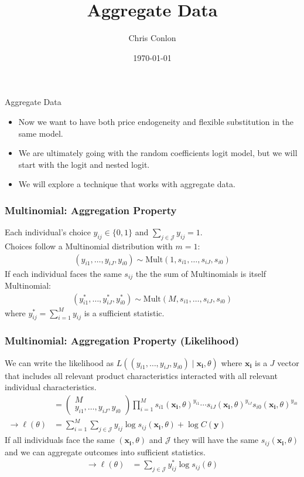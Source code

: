 \documentclass[xcolor=pdftex,dvipsnames,table,mathserif,aspectratio=169]{beamer}
\begin{document}
\title{Aggregate Data}
\author{Chris Conlon}
\date{\today}

\frame{\titlepage}

\begin{frame}{Aggregate Data}
 \begin{itemize}
\item Now we want to have both \alert{price endogeneity} and \alert{flexible substitution} in the same model.
\item We are ultimately going with the random coefficients logit model, but we will start with the logit and nested logit.
\item We will explore a technique that works with \alert{aggregate data}.
 \end{itemize}
\end{frame}



\begin{frame}
\frametitle{Multinomial:  Aggregation Property}
Each individual's choice $y_{ij} \in\{0,1\}$ and $\sum_{j \in \mathcal{J}} y_{ij} =1$.\\

Choices follow a Multinomial distribution with $m=1$:
\begin{align*}
(y_{i1},\ldots,y_{iJ},y_{i0}) \sim \text{Mult} (1,s_{i1},\ldots,s_{iJ},s_{i0} ) 
\end{align*}
If each individual faces the same $s_{ij}$ the the sum of Multinomials is itself Multinomial:
\begin{align*}
(y_{i1}^{*},\ldots,y_{iJ}^{*},y_{i0}^{*}) \sim \text{Mult} (M, s_{i1},\ldots,s_{iJ},s_{i0} ) 
\end{align*}
where $y_{ij}^{*}=\sum_{i=1}^M y_{ij}$ is a \alert{sufficient statistic}.
\end{frame}

\begin{frame}
\frametitle{Multinomial:  Aggregation Property (Likelihood)}
We can write the likelihood as $L\left((y_{i1},\ldots,y_{iJ},y_{i0})  \mid \mathbf{x_i},  \theta \right)$ where $\mathbf{x_i}$ is a $J$ vector that includes all relevant product characteristics interacted with all relevant individual characteristics.
\begin{align*}
&=
\left(\begin{array}{c}
M \\
y_{i1},\ldots, y_{iJ}, y_{i0}
\end{array}\right)
\prod_{i=1}^M s_{i1}(\mathbf{x_i},\theta)^{y_{i1}}\cdots s_{iJ}(\mathbf{x_i},\theta)^{y_{iJ}}  s_{i0}(\mathbf{x_i},\theta)^{y_{i0}}\\
\rightarrow \ell(\theta) &= \sum_{i=1}^M \sum_{j \in \mathcal{J}} y_{ij} \log s_{ij}(\mathbf{x_i},\theta) + \log C(\mathbf{y})
\end{align*}
If all individuals face the same $(\mathbf{x_i},\theta)$ and $\mathcal{J}$ they will have the same $s_{ij}(\mathbf{x_i},\theta)$ and we can aggregate outcomes into \alert{sufficient statistics}.
\begin{align*}
\rightarrow \ell(\theta) &=  \sum_{j \in \mathcal{J}} y_{ij}^{*} \log s_{ij}(\theta)
\end{align*}
\end{frame}
\end{document}
